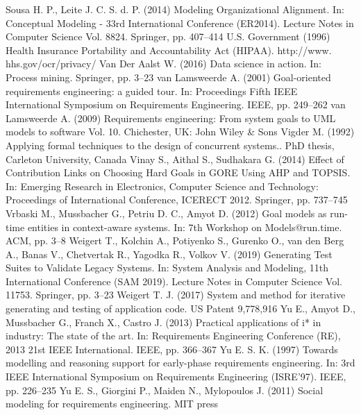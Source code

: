 Sousa H. P., Leite J. C. S. d. P. (2014) Modeling
Organizational Alignment. In: Conceptual Modeling - 33rd International Conference (ER2014).
Lecture Notes in Computer Science Vol. 8824.
Springer, pp. 407–414
U.S. Government (1996) Health Insurance Portability and Accountability Act (HIPAA). http://www.
hhs.gov/ocr/privacy/
Van Der Aalst W. (2016) Data science in action.
In: Process mining. Springer, pp. 3–23
van Lamsweerde A. (2001) Goal-oriented requirements engineering: a guided tour. In: Proceedings
Fifth IEEE International Symposium on Requirements Engineering. IEEE, pp. 249–262
van Lamsweerde A. (2009) Requirements engineering: From system goals to UML models to
software Vol. 10. Chichester, UK: John Wiley &
Sons
Vigder M. (1992) Applying formal techniques
to the design of concurrent systems.. PhD thesis,
Carleton University, Canada
Vinay S., Aithal S., Sudhakara G. (2014) Effect
of Contribution Links on Choosing Hard Goals
in GORE Using AHP and TOPSIS. In: Emerging
Research in Electronics, Computer Science and
Technology: Proceedings of International Conference, ICERECT 2012. Springer, pp. 737–745
Vrbaski M., Mussbacher G., Petriu D. C., Amyot
D. (2012) Goal models as run-time entities in
context-aware systems. In: 7th Workshop on Models@run.time. ACM, pp. 3–8
Weigert T., Kolchin A., Potiyenko S., Gurenko
O., van den Berg A., Banas V., Chetvertak R.,
Yagodka R., Volkov V. (2019) Generating Test
Suites to Validate Legacy Systems. In: System
Analysis and Modeling, 11th International Conference (SAM 2019). Lecture Notes in Computer
Science Vol. 11753. Springer, pp. 3–23
Weigert T. J. (2017) System and method for iterative generating and testing of application code.
US Patent 9,778,916
Yu E., Amyot D., Mussbacher G., Franch X.,
Castro J. (2013) Practical applications of i* in
industry: The state of the art. In: Requirements
Engineering Conference (RE), 2013 21st IEEE
International. IEEE, pp. 366–367
Yu E. S. K. (1997) Towards modelling and reasoning support for early-phase requirements engineering. In: 3rd IEEE International Symposium
on Requirements Engineering (ISRE’97). IEEE,
pp. 226–235
Yu E. S., Giorgini P., Maiden N., Mylopoulos J.
(2011) Social modeling for requirements engineering. MIT press